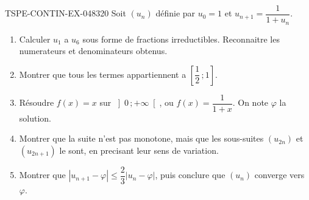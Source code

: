 \begin{exercice}{TSPE-CONTIN-EX-048}{3}{20}
Soit $(u_n)$ définie par $u_0 = 1$ et $u_{n+1} = \dfrac{1}{1 + u_n}$.
\begin{enumerate}
  \item Calculer $u_1$ a $u_6$ sous forme de fractions irreductibles. Reconnaitre les numerateurs et denominateurs obtenus.
  \item Montrer que tous les termes appartiennent a $\left[\dfrac12\,;1\right]$.
  \item Résoudre $f(x) = x$ sur $\left]0\,;+\infty\right[$, ou $f(x) = \dfrac{1}{1+x}$. On note $\varphi$ la solution.
  \item Montrer que la suite n'est pas monotone, mais que les sous-suites $(u_{2n})$ et $(u_{2n+1})$ le sont, en precisant leur sens de variation.
  \item Montrer que $\left|u_{n+1} - \varphi\right| \leq \dfrac{2}{3}\left|u_n - \varphi\right|$, puis conclure que $(u_n)$ converge vers $\varphi$.
\end{enumerate}
\end{exercice}
